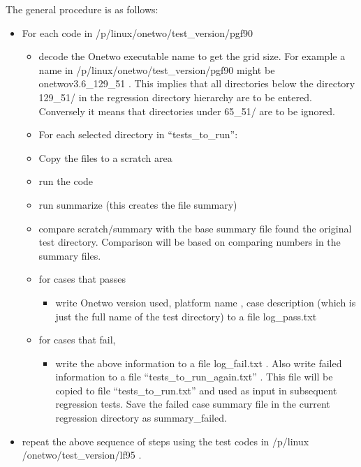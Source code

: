 \documentclass[12pt]{article}
\begin{document}
The general procedure is as follows:
\begin{itemize}
  \item For each code in /p/linux/onetwo/test\_version/pgf90 
    \begin{itemize}
      \item decode the Onetwo executable name to get the
            grid size. For example a name in
            /p/linux/onetwo/test\_version/pgf90 
          might be onetwov3.6\_129\_51 . This implies that all
          directories below the directory 129\_51/  in the regression
          directory hierarchy are to be entered. Conversely it 
         means that directories under 65\_51/ are to be ignored.
      \item For each selected directory in ``tests\_to\_run'':
  \item  Copy the files to a scratch area
  \item  run the code
  \item run summarize (this creates the file summary)
    \item compare scratch/summary with the base summary file found the
          original test directory. Comparison will be based on
          comparing numbers in the summary files. 
    \item for cases that passes 
   \begin{itemize}
     \item write Onetwo version used, platform name , case description
     (which is just the full name of the test directory) 
     to a file log\_pass.txt
   \end{itemize}
     \item    for cases that fail, 
      \begin{itemize}
     \item write the above information to a file
        log\_fail.txt . Also write failed information to a file
        ``tests\_to\_run\_again.txt'' . This file will be copied
        to file ``tests\_to\_run.txt'' and used as input in subsequent
        regression tests. Save the failed case summary file in 
        the current regression directory as summary\_failed.
    \end{itemize}
    \end{itemize}
    \item repeat the above sequence of steps  using the test codes in
      /p/linux /onetwo/test\_version/lf95 . 

\end{itemize}
\end{document}
